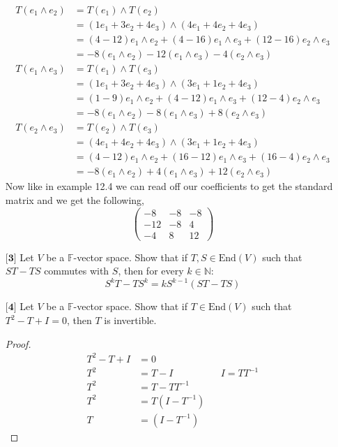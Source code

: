 \documentclass[12pt]{article}
\newcommand {\w} {{\wedge}}
\newcommand {\e}[3]{{#1e_1 + #2e_2 + #3e_3}}
\begin{document}
\begin{itemize}
\begin{align*}
        T(e_1 \wedge e_2) &= T(e_1) \wedge T(e_2) \\
        &=(\e{1}{3}{4}) \w (\e{4}{4}{4}) \\
        &= (4-12)e_1 \w e_2 + (4-16) e_1 \w e_3 + (12-16) e_2 \w e_3 \\ 
        &= -8(e_1 \w e_2) -12(e_1 \w e_3) -4(e_2\w e_3)\\
        T(e_1 \w e_3) &= T(e_1) \w T(e_3) \\ 
        &= (\e{1}{3}{4}) \w (\e{3}{1}{4}) \\
        &= (1-9)e_1 \w e_2 + (4-12)e_1 \w e_3 + (12 - 4)e_2 \w e_3 \\
        &= -8(e_1 \w e_2) -8(e_1 \w e_3) + 8 (e_2 \w e_3) \\
        T(e_2 \w e_3) &= T(e_2) \w T(e_3) \\
        &= (\e{4}{4}{4}) \w (\e{3}{1}{4}) \\
        &= (4 - 12)e_1 \w e_2 + (16-12)e_1\w e_3 + (16-4)e_2 \w e_3 \\
        &= -8(e_1 \w e_2) +4 (e_1 \w e_3) + 12(e_2 \w e_3)
    \end{align*}
    Now like in example 12.4 we can read off our coefficients to get the standard matrix and we get the following,
    \[\begin{pmatrix}
        -8 & -8 & -8 \\ -12 & -8 & 4 \\ -4 & 8 & 12
    \end{pmatrix}\]
    \vspace{.5cm}
    \item[$\textbf{[3]}$]
    Let $V$ be a $\mathbb{F}$-vector space. Show that if $T,S \in \text{End}(V)$ such that $ST - TS$ commutes with $S$, then for every $k \in \mathbb{N}$:
    \begin{equation*}
    S^kT - TS^k = kS^{k-1}(ST - TS)
    \end{equation*} 
    
    \vspace{.5cm}
    \item[$\textbf{[4]}$]
    Let $V$ be a $\mathbb{F}$-vector space. Show that if $T \in \text{End}(V)$ such that $T^2 - T + I = 0$, then $T$ is invertible. 
    \begin{proof}
        \begin{align*}
            T^2 - T + I &= 0 \\ 
            T^2 &= T-I && I = TT^{-1} \\
            T^2 &= T-TT^{-1} \\
            T^2 &= T(I - T^{-1}) \\
            T &= (I - T^{-1})
        \end{align*}


\end{proof}
\end{itemize}
\end{document}
